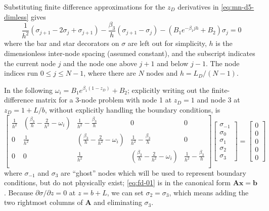 \documentclass[12pt,letterpaper]{article}
\begin{document}
Substituting finite difference approximations for the $z_D$
derivatives in \eqref{eq:mn-d5-dimless} gives
\begin{equation}
  \nonumber
  \frac{1}{h^2} \left( \sigma_{j+1} - 2 \sigma_j + \sigma_{j+1}
  \right) - \frac{\beta_3}{h} \left( \sigma_{j+1} - \sigma_j\right) -
  \left( B_1 e^{-\beta_1 jh} + B_2 \right) \sigma_j
  = 0
\end{equation}
where the bar and star decorators on $\sigma$ are left out for simplicity, $h$ is
the dimensionless inter-node spacing (assumed constant), and
the subscript indicates the current node $j$ and the node one above
$j+1$ and below $j-1$.  The node indices run $0 \le j \le N-1$, where
 there are $N$ nodes and $h = L_D / (N - 1)$.

In the following $\omega_i = B_1 e^{\beta_1 \left( 1 - z_D\right)} + B_2$;
explicitly writing out the finite-difference matrix for a 3-node
problem with node 1 at $z_D=1$ and node 3 at $z_D=1+L/b$, without
explicitly handling the boundary conditions, is
\begin{equation}
  \label{eq:fd-01}
  \left[ \begin{matrix}
    \frac{1}{h^2} & \left(\frac{\beta_3}{h} - \frac{2}{h^2} - \omega_i\right) &
    \frac{1}{h^2} - \frac{\beta_3}{h} & 0 & 0 \\ 
    0 & \frac{1}{h^2} & \left(\frac{\beta_3}{h} - \frac{2}{h^2} - \omega_i \right)&
    \frac{1}{h^2} - \frac{\beta_3}{h} & 0  \\ 
    0 & 0 & \frac{1}{h^2} & \left(\frac{\beta_3}{h} - \frac{2}{h^2}  -
      \omega_i \right) &
    \frac{1}{h^2} - \frac{\beta_3}{h} \\ 
  \end{matrix}\right] 
\left[\begin{matrix}
\sigma_{-1} \\ \sigma_0 \\ \sigma_1 \\ \sigma_2 \\ \sigma_3
\end{matrix}\right]
=
\left[\begin{matrix}
0 \\ 0\\ 0 \\ 0 \\ 0
\end{matrix}\right]
\end{equation}
where $\sigma_{-1}$ and $\sigma_3$ are ``ghost'' nodes
which will be used to represent boundary conditions, but do not
physically exist; \eqref{eq:fd-01} is in the canonical form $\mathbf{Ax}=\mathbf{b}$.  Because
$\partial \sigma/\partial z =0$ at $z = b+L$, we can set $\sigma_2=
\sigma_3$, which means adding the two rightmost columns of
$\mathbf{A}$ and eliminating $\sigma_3$.
\end{document}
